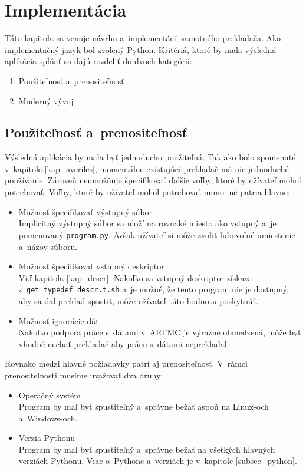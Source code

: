 \chapter{Implementácia}
\label{kap_imp}
Táto kapitola sa venuje návrhu a~implementácii samotného prekladača.
Ako implementačný jazyk bol zvolený Python. Kritériá, ktoré by mala výsledná
aplikácia spĺňať sa dajú rozdeliť do dvoch kategórií:
\begin{enumerate}
    \item Použiteľnosť a~prenositeľnosť
    \item Moderný vývoj
\end{enumerate}

\section{Použiteľnosť a~prenositeľnosť}
Výsledná aplikácia by mala byť jednoducho použiteľná. Tak ako bolo spomenuté
v~kapitole \ref{kap_averiles}, momentálne existujúci prekladač má nie jednoduché používanie. Zároveň
neumožňuje špecifikovať ďalšie voľby, ktoré by užívateľ mohol potrebovať. Voľby,
ktoré by užívateľ mohol potrebovať mimo iné patria hlavne:
\begin{itemize}
    \item Možnosť špecifikovať výstupný súbor\\
        Implicitný výstupný súbor sa uloží na rovnaké miesto ako vstupný a~je
        pomenovaný \texttt{program.py}. Avšak užívateľ si môže zvoliť ľubovoľné umiestenie
        a~názov súboru.
    \item Možnosť špecifikovať vstupný deskriptor\\
        Viď kapitola \ref{kap_descr}. Nakoľko sa vstupný deskriptor získava z~\texttt{get\_typedef\_descr.t.sh} a~je
        možné, že tento program nie je dostupný, aby sa dal preklad spustiť, môže
        užívateľ túto hodnotu poskytnúť.
    \item Možnosť ignorácie dát\\
        Nakoľko podpora práce s~dátami v~ARTMC je výrazne obmedzená, môže byť
        vhodné nechať prekladač aby prácu s~dátami neprekladal.
\end{itemize}

Rovnako medzi hlavné požiadavky patrí aj prenositeľnosť. V~rámci prenositeľnosti
musíme uvažovať dva druhy:
\begin{itemize}
    \item Operačný systém\\
        Program by mal byť spustiteľný a~správne bežať aspoň na Linux-och a~Windows-och.
    \item Verzia Pythonu\\
        Program by mal byť spustiteľný a~správne bežať na všetkých hlavných verziách Pythonu.
        Viac o~Pythone a~verziách je v~kapitole \ref{subsec_python}.
\end{itemize}

